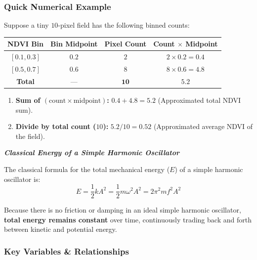 \documentclass[12pt, letterpaper]{article}
\begin{document}
\subsubsection*{Quick Numerical Example}

Suppose a tiny $10$-pixel field has the following binned counts:

\begin{center}
\begin{tabular}{@{}cccc@{}}
\toprule
\textbf{NDVI Bin} & \textbf{Bin Midpoint} & \textbf{Pixel Count} & \textbf{Count $\times$ Midpoint} \\
\midrule
$[0.1, 0.3]$ & $0.2$ & $2$ & $2 \times 0.2 = 0.4$ \\
$[0.5, 0.7]$ & $0.6$ & $8$ & $8 \times 0.6 = 4.8$ \\
\midrule
\textbf{Total} & --- & $\mathbf{10}$ & $\mathbf{5.2}$ \\
\bottomrule
\end{tabular}
\end{center}

\begin{enumerate}[leftmargin=1.5em]
    \item \textbf{Sum of $(\text{count} \times \text{midpoint})$:} $0.4 + 4.8 = \mathbf{5.2}$ (Approximated total NDVI sum).
    \item \textbf{Divide by total count ($10$):} $5.2 / 10 = \mathbf{0.52}$ (Approximated average NDVI of the field).
\end{enumerate}





\bigskip 
\LARGE
\begin{flushleft}
\textbf{\textit{Classical Energy of a Simple Harmonic Oscillator}}
\end{flushleft}
\normalsize

The classical formula for the total mechanical energy ($E$) of a simple harmonic oscillator is:
\begin{equation}
E = \frac{1}{2}kA^2 = \frac{1}{2}m\omega^2 A^2 = 2\pi^2 m f^2 A^2
\end{equation}

Because there is no friction or damping in an ideal simple harmonic oscillator, \textbf{total energy remains constant} over time, continuously trading back and forth between kinetic and potential energy.



\subsubsection*{Key Variables \& Relationships}
\end{document}
